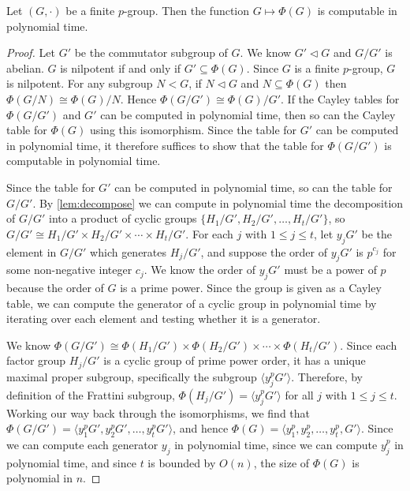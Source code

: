 \documentclass{article}
\newcommand{\gen}[1]{{\langle #1 \rangle}}
\begin{document}
\begin{lemma}\label{lem:frattinip}
  Let $(G, \cdot)$ be a finite $p$-group.
  Then the function $G \mapsto \Phi(G)$ is computable in polynomial time.
\end{lemma}
\begin{proof}
  Let $G'$ be the commutator subgroup of $G$.
  We know $G' \triangleleft G$ and $G/G'$ is abelian.
  $G$ is nilpotent if and only if $G' \subseteq \Phi(G)$.
  Since $G$ is a finite $p$-group, $G$ is nilpotent.
  For any subgroup $N < G$, if $N \triangleleft G$ and $N \subseteq \Phi(G)$ then $\Phi(G / N) \cong \Phi(G) / N$.
  Hence $\Phi(G / G') \cong \Phi(G) / G'$.
  If the Cayley tables for $\Phi(G / G')$ and $G'$ can be computed in polynomial time, then so can the Cayley table for $\Phi(G)$ using this isomorphism.
  Since the table for $G'$ can be computed in polynomial time, it therefore suffices to show that the table for $\Phi(G / G')$ is computable in polynomial time.

  Since the table for $G'$ can be computed in polynomial time, so can the table for $G / G'$.
  By \autoref{lem:decompose} we can compute in polynomial time the decomposition of $G / G'$ into a product of cyclic groups $\{H_1 / G', H_2 / G', \dotsc, H_t / G'\}$, so $G / G' \cong H_1 / G' \times H_2 / G' \times \dotsb \times H_t / G'$.
  For each $j$ with $1 \leq j \leq t$, let $y_jG'$ be the element in $G / G'$ which generates $H_j / G'$, and suppose the order of $y_jG'$ is $p^{c_j}$ for some non-negative integer $c_j$.
  We know the order of $y_jG'$ must be a power of $p$ because the order of $G$ is a prime power.
  Since the group is given as a Cayley table, we can compute the generator of a cyclic group in polynomial time by iterating over each element and testing whether it is a generator.

  We know $\Phi(G / G') \cong \Phi(H_1 / G') \times \Phi(H_2 / G') \times \dotsb \times \Phi(H_t / G')$.
  Since each factor group $H_j / G'$ is a cyclic group of prime power order, it has a unique maximal proper subgroup, specifically the subgroup $\gen{y_j^pG'}$.
  Therefore, by definition of the Frattini subgroup, $\Phi(H_j / G') = \gen{y_j^pG'}$ for all $j$ with $ 1 \leq j \leq t$.
  Working our way back through the isomorphisms, we find that $\Phi(G / G') = \gen{y_1^pG', y_2^pG', \dotsc, y_t^pG'}$, and hence $\Phi(G) = \gen{y_1^p, y_2^p, \dotsc, y_t^p, G'}$.
  Since we can compute each generator $y_j$ in polynomial time, since we can compute $y_j^p$ in polynomial time, and since $t$ is bounded by $O(n)$, the size of $\Phi(G)$ is polynomial in $n$.
\end{proof}
\end{document}

